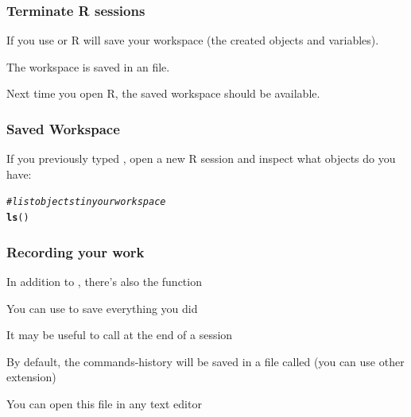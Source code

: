 \documentclass[12pt]{beamer}\usepackage[]{graphicx}\usepackage[]{color}
\makeatletter
\newcommand{\hlcom}[1]{\textcolor[rgb]{0.678,0.584,0.686}{\textit{#1}}}%
\newcommand{\hlstd}[1]{\textcolor[rgb]{0.345,0.345,0.345}{#1}}%
\newcommand{\hlkwd}[1]{\textcolor[rgb]{0.737,0.353,0.396}{\textbf{#1}}}%
\newenvironment{kframe}{%
 \def\at@end@of@kframe{}%
 \ifinner\ifhmode%
  \def\at@end@of@kframe{\end{minipage}}%
  \begin{minipage}{\columnwidth}%
 \fi\fi%
 \def\FrameCommand##1{\hskip\@totalleftmargin \hskip-\fboxsep
 \colorbox{shadecolor}{##1}\hskip-\fboxsep
     \hskip-\linewidth \hskip-\@totalleftmargin \hskip\columnwidth}%
 \MakeFramed {\advance\hsize-\width
   \@totalleftmargin\z@ \linewidth\hsize
   \@setminipage}}%
 {\par\unskip\endMakeFramed%
 \at@end@of@kframe}
\newenvironment{knitrout}{}{} %
\makeatother
\begin{document}

\begin{frame}[fragile]
\frametitle{Terminate R sessions}

\bi
  \item If you use  or  R will save your workspace (the created objects and variables).
  \item The workspace is saved in an  file.
  \item Next time you open R, the saved workspace should be available.
\ei

\end{frame}


\begin{frame}[fragile]
\frametitle{Saved Workspace}

If you previously typed , open a new R session and inspect what objects do you have:
\begin{knitrout}\footnotesize
{}\color{fgcolor}\begin{kframe}
\begin{alltt}
\hlcom{# list objectst in your workspace}
\hlkwd{ls}\hlstd{()}
\end{alltt}
\end{kframe}
\end{knitrout}

\end{frame}


\begin{frame}
\frametitle{Recording your work}

\bi
  \item In addition to , there's also the function {\hilit {}}
  \item You can use  to save everything you did
  \item It may be useful to call  at the end of a session
  \item By default, the commands-history will be saved in a file called  (you can use other extension)
  \item You can open this file in any text editor
\ei

\end{frame}
\end{document}
